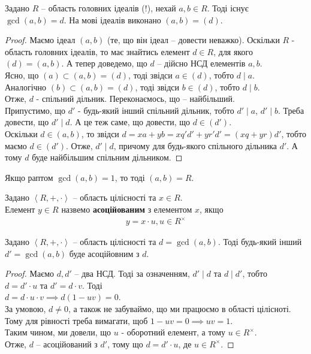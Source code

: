 \documentclass{math_library}
\begin{document}
\begin{proposition}
Задано $R$ -- область головних ідеалів (!), нехай $a,b \in R$. Тоді існує $\gcd(a,b) = d$. На мові ідеалів виконано $(a,b) = (d)$.
\end{proposition}

\begin{proof}
Маємо ідеал $(a,b)$ (те, що він ідеал -- довести неважко). Оскільки $R$ - область головних ідеалів, то має знайтись елемент $d \in R$, для якого $(d) = (a,b)$. А тепер доведемо, що $d$ -- дійсно НСД елементів $a,b$.\\
Ясно, що $(a) \subset (a,b) = (d)$, тоді звідси $a \in (d)$, тобто $d \mid a$.\\
Аналогічно $(b) \subset (a,b) = (d)$, тоді звідси $b \in (d)$, тобто $d \mid b$.\\
Отже, $d$ - спільний дільник. Переконаємось, що -- найбільший.\\
Припустимо, що $d'$ - будь-який інший спільний дільник, тобто $d' \mid a$, $d' \mid b$. Треба довести, що $d' \mid d$. А це теж саме, що довести, що $d \in (d')$.\\
Оскільки $d \in (a,b)$, то звідси $d = xa + yb = xq'd' + yr'd' = (xq+yr)d'$, тобто маємо $d \in (d')$. Отже, $d' \mid d$, причому для будь-якого спільного дільника $d'$. А тому $d$ буде найбільшим спільним дільником.
\end{proof}

\begin{corollary}
Якщо раптом $\gcd(a,b) = 1$, то тоді $(a,b) = R$.
\end{corollary}

\begin{definition}
Задано $\left<R,+,\cdot \right>$ -- область цілісності та $x \in R$.\\
Елемент $y \in R$ назвемо \textbf{асоційованим} з елементом $x$, якщо
\begin{align*}
y = x \cdot u, u \in R^\times
\end{align*}
\end{definition}



\begin{proposition}["Єдиність"]
Задано $\left<R,+,\cdot\right>$ -- область цілісності та $d = \gcd(a,b)$. Тоді будь-який інший $d' = \gcd(a,b)$ буде асоційовним з $d$.
\end{proposition}

\begin{proof}
Маємо $d,d'$ -- два НСД. Тоді за означенням, $d' \mid  d$ та $d \mid d'$, тобто\\
$d = d' \cdot u$ та $d' = d \cdot v$. Тоді\\
$d = d \cdot u \cdot v \implies d(1-uv) = 0$.\\
За умовою, $d \neq 0$, а також не забуваймо, що ми працюємо в області цілісноті. Тому для рівності треба вимагати, щоб $1 - uv = 0 \implies uv = 1$.\\
Таким чином, ми довели, що $u$ - оборотний елемент, а тому $u \in R^\times$.\\
Отже, $d$ -- асоційований з $d'$, тому що $d = d' \cdot u$, де $u \in R^\times$.
\end{proof}
\end{document}
